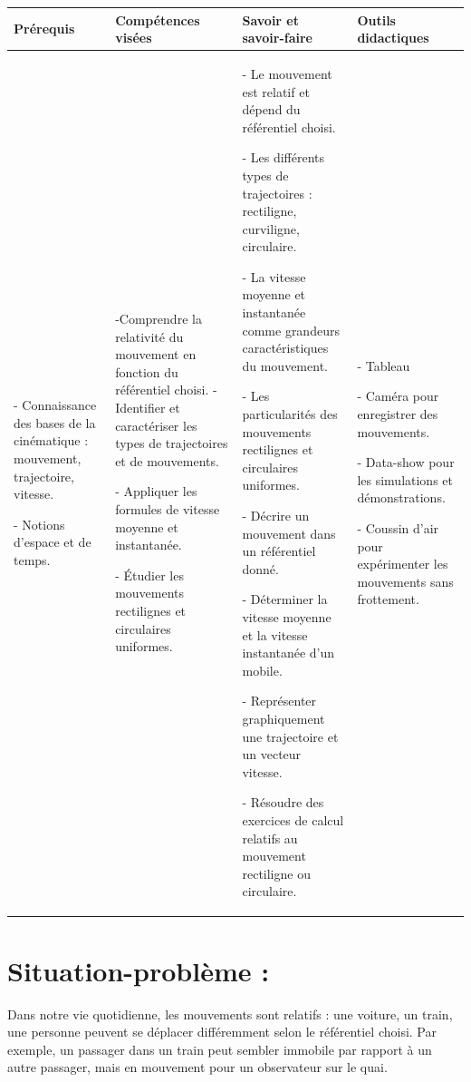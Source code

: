 \documentclass[14pt]{article}
\begin{document}
 \begin{center}
	 \begin{tabular}{|p{}||p{}||p{}||p{}|}
\hline
\textbf{Prérequis} & \textbf{Compétences visées } & \textbf{Savoir et savoir-faire}&\textbf{Outils didactiques }\\
    \hline
    	
      - Connaissance des bases de la cinématique : mouvement, trajectoire, vitesse.			   

      - Notions d’espace et de temps.

           &
         -Comprendre la relativité du mouvement en fonction du référentiel choisi.
- Identifier et caractériser les types de trajectoires et de mouvements.

     - Appliquer les formules de vitesse moyenne et instantanée.

- Étudier les mouvements rectilignes et circulaires uniformes.
 & 
- Le mouvement est relatif et dépend du référentiel choisi.

 - Les différents types de trajectoires : rectiligne, curviligne, circulaire.

- La vitesse moyenne et instantanée comme grandeurs caractéristiques du mouvement.

- Les particularités des mouvements rectilignes et circulaires uniformes.

- Décrire un mouvement dans un référentiel donné.

- Déterminer la vitesse moyenne et la vitesse instantanée d’un mobile.

- Représenter graphiquement une trajectoire et un vecteur vitesse.

- Résoudre des exercices de calcul relatifs au mouvement rectiligne ou circulaire. 
 & 
- Tableau 

- Caméra pour enregistrer des mouvements.

- Data-show pour les simulations et démonstrations.

- Coussin d’air pour expérimenter les mouvements sans frottement.


     \\
    \hline
\end{tabular} 
\end{center}
\section*{Situation-problème :}
Dans notre vie quotidienne, les mouvements sont relatifs : une voiture, un train, une personne peuvent se déplacer différemment selon le référentiel choisi. Par exemple, un passager dans un train peut sembler immobile par rapport à un autre passager, mais en mouvement pour un observateur sur le quai.
\end{document}
